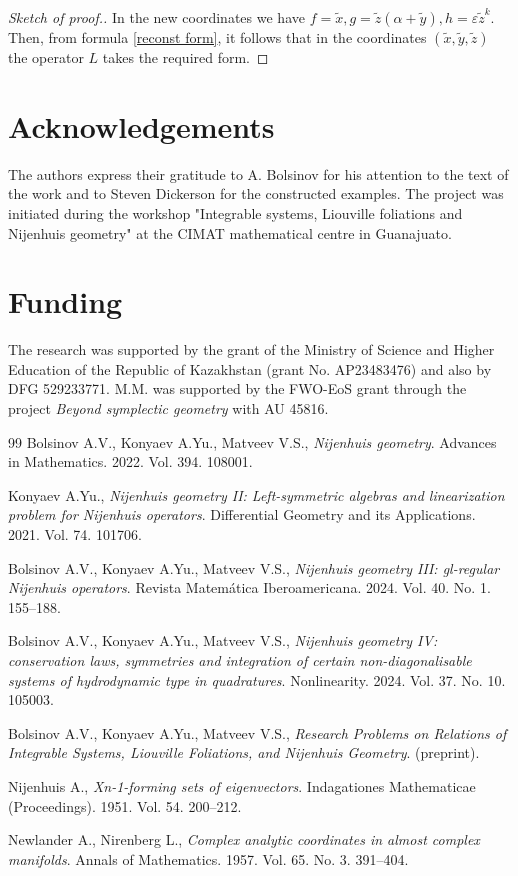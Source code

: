 \documentclass[10pt,a4paper]{amsart}
\begin{document}
\begin{proof}[Sketch of proof.]
In the new coordinates we have $f=\tilde x,
g=\tilde z(\alpha+\tilde y),
h=\varepsilon\tilde z^k.$ Then, from formula \eqref{reconst form}, it follows that in the coordinates $(\tilde x,\tilde y,\tilde z)$ the operator \(L\) takes the required form.
\end{proof}


\section*{Acknowledgements}
The authors express their gratitude to A. Bolsinov for his attention to the text of the work and to Steven Dickerson for the constructed examples. The project was initiated during the workshop "Integrable systems, Liouville foliations and Nijenhuis geometry" at the CIMAT mathematical centre in Guanajuato.

\section*{Funding}
The research was supported by the grant of the Ministry of Science and Higher Education of the Republic of Kazakhstan (grant No. AP23483476) and also by DFG 529233771. M.M. was supported by the FWO-EoS grant through the project \textit{Beyond symplectic geometry} with AU 45816.

\begin{thebibliography}{99}
    Bolsinov A.V., Konyaev A.Yu., Matveev V.S., \emph{Nijenhuis geometry}. Advances in Mathematics. 2022. Vol. 394. 108001.

Konyaev A.Yu., \emph{Nijenhuis geometry II: Left-symmetric algebras and linearization problem for Nijenhuis operators}. Differential Geometry and its Applications. 2021. Vol. 74. 101706.

Bolsinov A.V., Konyaev A.Yu., Matveev V.S., \emph{Nijenhuis geometry III: gl-regular Nijenhuis operators}. Revista Matemática Iberoamericana. 2024. Vol. 40. No. 1. 155--188.

Bolsinov A.V., Konyaev A.Yu., Matveev V.S., \emph{Nijenhuis geometry IV: conservation laws, symmetries and integration of certain non-diagonalisable systems of hydrodynamic type in quadratures}. Nonlinearity. 2024. Vol. 37. No. 10. 105003.

Bolsinov A.V., Konyaev A.Yu., Matveev V.S., \emph{Research Problems on Relations of Integrable Systems, Liouville Foliations, and Nijenhuis Geometry}. (preprint).

Nijenhuis A., \emph{Xn-1-forming sets of eigenvectors}. Indagationes Mathematicae (Proceedings). 1951. Vol. 54. 200--212.

Newlander A., Nirenberg L., \emph{Complex analytic coordinates in almost complex manifolds}. Annals of Mathematics. 1957. Vol. 65. No. 3. 391--404.
\end{thebibliography}
\end{document}
